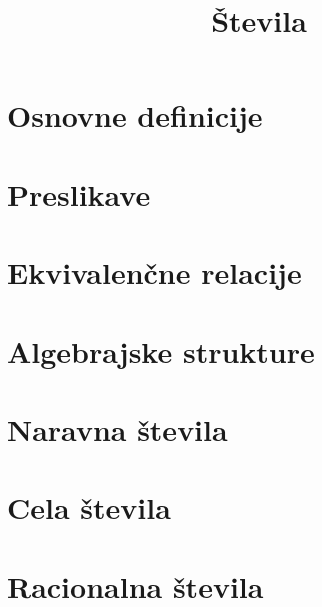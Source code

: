 \documentclass[11pt]{article}
\title{Števila}
\begin{document}
    \maketitle
    \pagebreak

    \section{Osnovne definicije}
    
    \pagebreak

    \section{Preslikave}
    
    \pagebreak

    \section{Ekvivalenčne relacije}
    
    \pagebreak

    \section{Algebrajske strukture}
    
    \pagebreak

    \section{Naravna števila}
    
    \pagebreak

    \section{Cela števila}
    
    \pagebreak

    \section{Racionalna števila}
    
    \pagebreak
\end{document}
